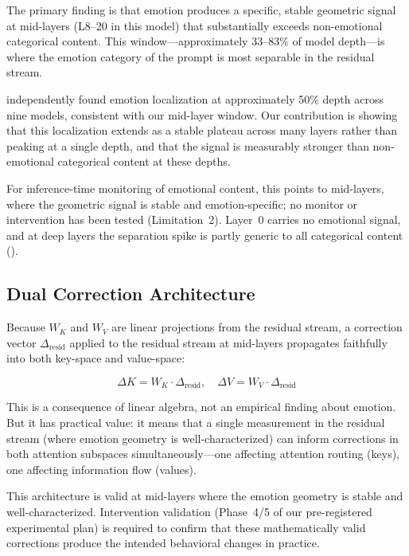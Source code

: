 \documentclass[11pt,a4paper]{article}
\begin{document}
The primary finding is that emotion produces a specific, stable geometric
signal at mid-layers (L8--20 in this model) that substantially exceeds
non-emotional categorical content. This window---approximately 33--83\%
of model depth---is where the emotion category of the prompt is most
separable in the residual stream.

\citet{jeong2026emotion} independently found emotion localization at
approximately 50\% depth across nine models, consistent with our
mid-layer window. Our contribution is showing that this localization
extends as a stable plateau across many layers rather than peaking at a
single depth, and that the signal is measurably stronger than
non-emotional categorical content at these depths.

For inference-time monitoring of emotional content, this points to
mid-layers, where the geometric signal is stable and emotion-specific;
no monitor or intervention has been tested (Limitation~2). Layer~0 carries no emotional signal, and at
deep layers the separation spike is partly generic to all categorical
content ().

\subsection{Dual Correction Architecture}
\label{sec:dual}

Because $W_K$ and $W_V$ are linear projections from the residual stream,
a correction vector $\Delta_{\text{resid}}$ applied to the residual
stream at mid-layers propagates faithfully into both key-space and
value-space:

\begin{equation}
\Delta K = W_K \cdot \Delta_{\text{resid}}, \quad
\Delta V = W_V \cdot \Delta_{\text{resid}}
\label{eq:dual}
\end{equation}

This is a consequence of linear algebra, not an empirical finding about
emotion. But it has practical value: it means that a single measurement
in the residual stream (where emotion geometry is well-characterized) can
inform corrections in both attention subspaces simultaneously---one
affecting attention routing (keys), one affecting information flow
(values).

This architecture is valid at mid-layers where the emotion geometry is
stable and well-characterized. Intervention validation (Phase~4/5 of our
pre-registered experimental plan) is required to confirm that these
mathematically valid corrections produce the intended behavioral changes
in practice.
\end{document}
